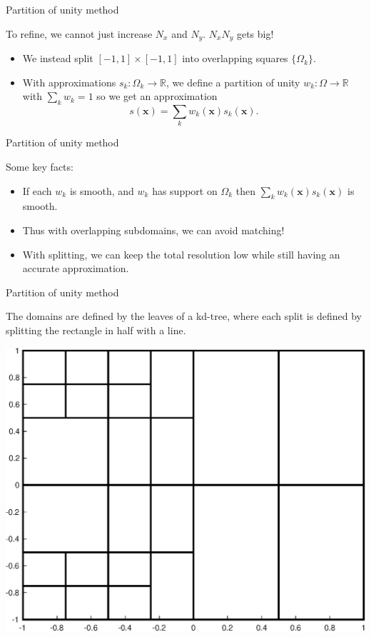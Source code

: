 \documentclass{beamer}
\newcommand{\R}{\mathbb{R}}
\newcommand{\vect}[1]{\mathbf{#1}}
\begin{document}
\begin{frame}{Partition of unity method}

To refine, we cannot just increase $N_x$ and $N_y$. $N_x N_y$ gets big!

\bigskip

\begin{itemize}
\item We instead split $[-1,1] \times [-1,1]$ into overlapping squares $\{ \Omega_k \}$.
\item With approximations $s_k:\Omega_k \to \R$, we define a partition of unity $w_k:\Omega \to \R$ with $\sum_k w_k=1$ so we get an approximation $$s(\vect{x}) = \sum_k w_k(\vect{x})s_k(\vect{x}).$$
\end{itemize}

\end{frame}

\begin{frame}{Partition of unity method}
\begin{center}
Some key facts:
\end{center}

\begin{itemize}
\item If each $w_k$ is smooth, and $w_k$ has support on $\Omega_k$ then $\sum_k w_k(\vect{x})s_k(\vect{x})$ is smooth.
\item Thus with overlapping subdomains, we can avoid matching!
\item With splitting, we can keep the total resolution low while still having an accurate approximation.
\end{itemize}
\end{frame}

\begin{frame}{Partition of unity method}

The domains are defined by the leaves of a kd-tree, where each split is defined by splitting the rectangle in half with a line.
\bigskip

\begin{center}
\includegraphics[scale = 0.4]{zonePlot.eps}
\end{center}
\end{frame}
\end{document}
